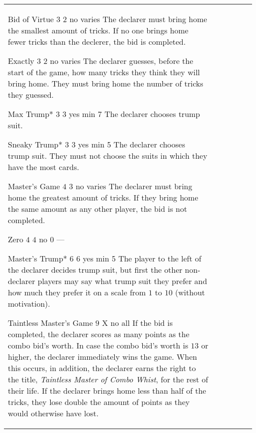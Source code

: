 \begin{table}
\begin{center}
\begin{tabularx}{\textwidth}{lcccc|X}
				\standardBidItem%
				{Bid of Virtue}
				{$3$}
				{$2$}
				{no}
				{varies}
				{%
					The declarer must bring home the smallest amount of tricks. If no one brings home fewer tricks than the declerer, the bid is completed.
				}

				\standardBidItem%
				{Exactly}
				{$3$}
				{$2$}
				{no}
				{varies}
				{%
					The declarer guesses, before the start of the game, how many tricks they think they will bring home. They must bring home the number of tricks they guessed.
				}

				\standardBidItem%
				{Max Trump*}
				{$3$}
				{$3$}
				{yes}
				{min 7}
				{%
					The declarer chooses trump suit.
				}

				\standardBidItem%
				{Sneaky Trump*}
				{$3$}
				{$3$}
				{yes}
				{min 5}
				{%
					The declarer chooses trump suit. They must not choose the suits in which they have the most cards.
				}

				\standardBidItem%
				{Master's Game}
				{$4$}
				{$3$}
				{no}
				{varies}
				{%
					The declarer must bring home the greatest amount of tricks. If they bring home the same amount as any other player, the bid is not completed. 
				}

				\standardBidItem%
				{Zero}
				{$4$}
				{$4$}
				{no}
				{0}
				{%
					---
				}

				\standardBidItem%
				{Master's Trump*}
				{$6$}
				{$6$}
				{yes}
				{min 5}
				{%
					The player to the left of the declarer decides trump suit, but first the other non-declarer players may say what trump suit they prefer and how much they prefer it on a scale from $1$ to $10$ (without motivation).
				}

				\standardBidItem%
				{Taintless Master's Game}
				{$9$}
				{X}
				{no}
				{all}
				{%
					If the bid is completed, the declarer scores as many points as the combo bid's worth. In case the combo bid's worth is $13$ or higher, the declarer immediately wins the game. When this occurs, in addition, the declarer earns the right to the title, \emph{Taintless Master of Combo Whist}, for the rest of their life. If the declarer brings home less than half of the tricks, they lose double the amount of points as they would otherwise have lost.
				}
		\end{tabularx}
	\end{center}
\end{table}
